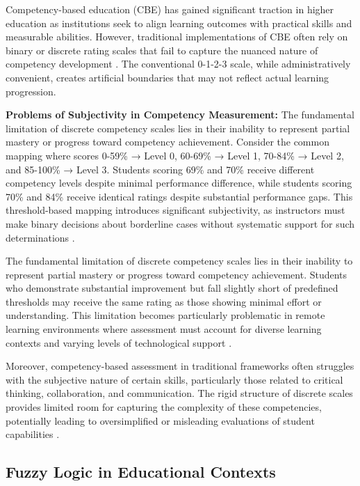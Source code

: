 Competency-based education (CBE) has gained significant traction in higher education as institutions seek to align learning outcomes with practical skills and measurable abilities. However, traditional implementations of CBE often rely on binary or discrete rating scales that fail to capture the nuanced nature of competency development \cite{Brown2023}. The conventional 0-1-2-3 scale, while administratively convenient, creates artificial boundaries that may not reflect actual learning progression.

\textbf{Problems of Subjectivity in Competency Measurement:} The fundamental limitation of discrete competency scales lies in their inability to represent partial mastery or progress toward competency achievement. Consider the common mapping where scores 0-59\% → Level 0, 60-69\% → Level 1, 70-84\% → Level 2, and 85-100\% → Level 3. Students scoring 69\% and 70\% receive different competency levels despite minimal performance difference, while students scoring 70\% and 84\% receive identical ratings despite substantial performance gaps. This threshold-based mapping introduces significant subjectivity, as instructors must make binary decisions about borderline cases without systematic support for such determinations \cite{Garcia2024}.

The fundamental limitation of discrete competency scales lies in their inability to represent partial mastery or progress toward competency achievement. Students who demonstrate substantial improvement but fall slightly short of predefined thresholds may receive the same rating as those showing minimal effort or understanding. This limitation becomes particularly problematic in remote learning environments where assessment must account for diverse learning contexts and varying levels of technological support \cite{Garcia2024}.

Moreover, competency-based assessment in traditional frameworks often struggles with the subjective nature of certain skills, particularly those related to critical thinking, collaboration, and communication. The rigid structure of discrete scales provides limited room for capturing the complexity of these competencies, potentially leading to oversimplified or misleading evaluations of student capabilities \cite{Johnson2023}.

\subsection{Fuzzy Logic in Educational Contexts}

